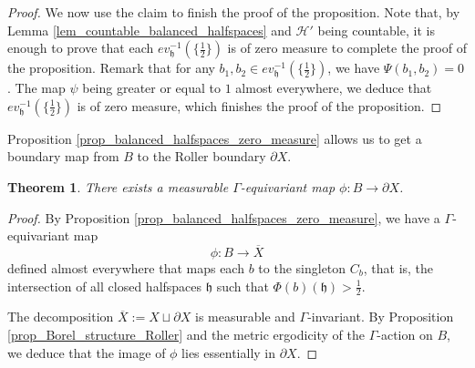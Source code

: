 \documentclass{amsart}
\numberwithin{equation}{section}
\newtheorem{thm}{Theorem}[section]
\newcommand{\HH}{\mathcal{H}}     %
\newcommand{\hh}{\mathfrak{h}}    %
\theoremstyle{definition}
\def\bar{\overline}
\begin{document}
\begin{proof}
        \par
        We now use the claim to finish the proof of the proposition. Note that, by Lemma \ref{lem_countable_balanced_halfspaces} and $\HH'$ being countable, it is enough to prove that each $ev_\hh^{-1}(\{\frac{1}{2}\})$ is of zero measure to complete the proof of the proposition. Remark that for any $b_1,b_2\in ev_\hh^{-1}(\{\frac{1}{2}\})$, we have $\Psi(b_1,b_2)=0$. The map $\psi$ being greater or equal to $1$ almost everywhere, we deduce that $ev_\hh^{-1}(\{\frac{1}{2}\})$ is of zero measure, which finishes the proof of the proposition.
    \end{proof}
Proposition \ref{prop_balanced_halfspaces_zero_measure} allows us to get a boundary map from $B$ to the Roller boundary $\partial X$.
\begin{thm}\label{thm_contruction_boundary_map}
 There exists a measurable $\Gamma$-equivariant map $\phi:B\rightarrow \partial{X}$.
\end{thm}
\begin{proof}
    By Proposition \ref{prop_balanced_halfspaces_zero_measure}, we have a $\Gamma$-equivariant map 
    \[
     \phi:B\rightarrow \bar{X}
    \]
    defined almost everywhere that maps each $b$ to the singleton $C_b$, that is, the intersection of all closed halfspaces $\hh$ such that $\Phi(b)(\hh)>\frac{1}{2}$. \par 
    \par
    The decomposition $\bar{X}:=X\sqcup \partial X$ is measurable and $\Gamma$-invariant. By Proposition \ref{prop_Borel_structure_Roller} and the metric ergodicity of the $\Gamma$-action on $B$, we deduce that the image of $\phi$ lies essentially in $\partial X$.
\end{proof}
\end{document}
